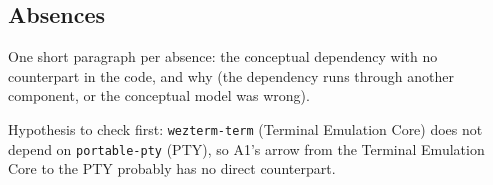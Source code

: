 \subsection{Absences}
\label{sec:absences}

\begin{requirements}
  \item One short paragraph per absence: the conceptual dependency with no counterpart in the code, and why (the dependency runs through another component, or the conceptual model was wrong).
  \item Hypothesis to check first: \texttt{wezterm-term} (Terminal Emulation Core) does not depend on \texttt{portable-pty} (PTY), so A1's arrow from the Terminal Emulation Core to the PTY probably has no direct counterpart.
\end{requirements}
